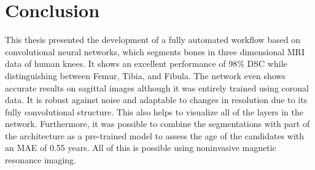 \section{Conclusion}

This thesis presented the development of a fully automated workflow based on convolutional neural networks, which segments bones in three dimensional MRI data of human knees. It shows an excellent performance of 98\% DSC while distinguishing between Femur, Tibia, and Fibula. The network even shows accurate results on sagittal images although it was entirely trained using coronal data. It is robust against noise and adaptable to changes in resolution due to its fully convolutional structure. This also helps to visualize all of the layers in the network. Furthermore, it was possible to combine the segmentations with part of the architecture as a pre-trained model to assess the age of the candidates with an MAE of 0.55 years. All of this is possible using noninvasive magnetic resonance imaging.

\newpage